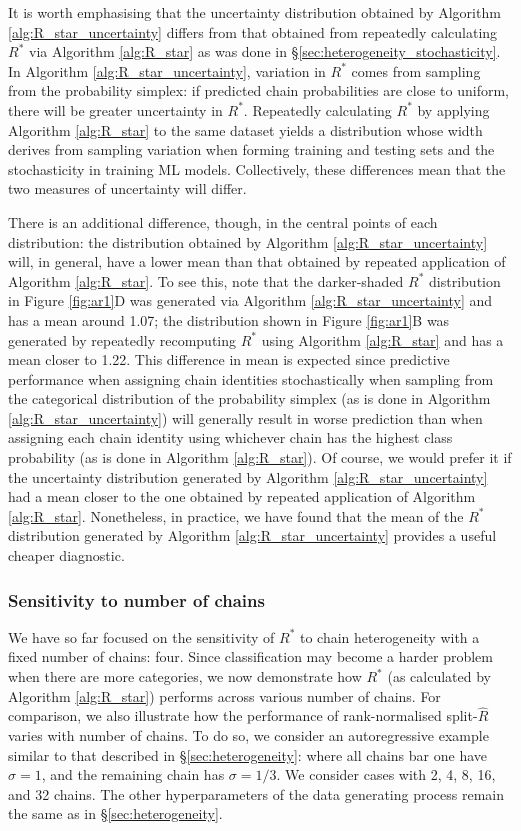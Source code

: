 \documentclass[ba]{imsart}
\numberwithin{equation}{section}
\theoremstyle{plain}
\begin{document}
It is worth emphasising that the uncertainty distribution obtained by Algorithm \ref{alg:R_star_uncertainty} differs from that obtained from repeatedly calculating $R^*$ via Algorithm \ref{alg:R_star} as was done in \S\ref{sec:heterogeneity_stochasticity}. In Algorithm \ref{alg:R_star_uncertainty}, variation in $R^*$ comes from sampling from the probability simplex: if predicted chain probabilities are close to uniform, there will be greater uncertainty in $R^*$. Repeatedly calculating $R^*$ by applying Algorithm \ref{alg:R_star} to the same dataset yields a distribution whose width derives from sampling variation when forming training and testing sets and the stochasticity in training ML models. Collectively, these differences mean that the two measures of uncertainty will differ.

There is an additional difference, though, in the central points of each distribution: the distribution obtained by Algorithm \ref{alg:R_star_uncertainty} will, in general, have a lower mean than that obtained by repeated application of Algorithm \ref{alg:R_star}. To see this, note that the darker-shaded $R^*$ distribution in Figure \ref{fig:ar1}D was generated via Algorithm \ref{alg:R_star_uncertainty} and has a mean around 1.07; the distribution shown in Figure \ref{fig:ar1}B was generated by repeatedly recomputing $R^*$ using Algorithm \ref{alg:R_star} and has a mean closer to 1.22. This difference in mean is expected since predictive performance when assigning chain identities stochastically when sampling from the categorical distribution of the probability simplex (as is done in Algorithm \ref{alg:R_star_uncertainty}) will generally result in worse prediction than when assigning each chain identity using whichever chain has the highest class probability (as is done in Algorithm \ref{alg:R_star}). Of course, we would prefer it if the uncertainty distribution generated by Algorithm \ref{alg:R_star_uncertainty} had a mean closer to the one obtained by repeated application of Algorithm \ref{alg:R_star}. Nonetheless, in practice, we have found that the mean of the $R^*$ distribution generated by Algorithm \ref{alg:R_star_uncertainty} provides a useful cheaper diagnostic.

\subsubsection{Sensitivity to number of chains}\label{sec:heterogeneity_numchains}
We have so far focused on the sensitivity of $R^*$ to chain heterogeneity with a fixed number of chains: four. Since classification may become a harder problem when there are more categories, we now demonstrate how $R^*$ (as calculated by Algorithm \ref{alg:R_star}) performs across various number of chains. For comparison, we also illustrate how the performance of rank-normalised split-$\widehat{R}$ varies with number of chains. To do so, we consider an autoregressive example similar to that described in \S\ref{sec:heterogeneity}: where all chains bar one have $\sigma=1$, and the remaining chain has $\sigma=1/3$. We consider cases with 2, 4, 8, 16, and 32 chains. The other hyperparameters of the data generating process remain the same as in \S\ref{sec:heterogeneity}.
\end{document}
